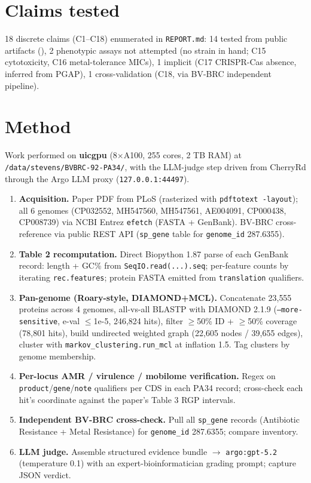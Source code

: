 \documentclass[11pt]{article}
\begin{document}
\section{Claims tested}
18 discrete claims (C1--C18) enumerated in \texttt{REPORT.md}: 14 tested from public artifacts
(\checkmark), 2 phenotypic assays not attempted (no strain in hand; C15 cytotoxicity, C16
metal-tolerance MICs), 1 implicit (C17 CRISPR-Cas absence, inferred from PGAP), 1 cross-validation
(C18, via BV-BRC independent pipeline).

\section{Method}
Work performed on \textbf{uicgpu} (8$\times$A100, 255 cores, 2 TB RAM) at
\texttt{/data/stevens/BVBRC-92-PA34/}, with the LLM-judge step driven from CherryRd through the
Argo LLM proxy (\texttt{127.0.0.1:44497}).

\begin{enumerate}
  \item \textbf{Acquisition.} Paper PDF from PLoS (rasterized with \texttt{pdftotext -layout});
        all 6 genomes (CP032552, MH547560, MH547561, AE004091, CP000438, CP008739) via NCBI Entrez
        \texttt{efetch} (FASTA + GenBank). BV-BRC cross-reference via public REST API
        (\texttt{sp\_gene} table for \texttt{genome\_id} 287.6355).
  \item \textbf{Table 2 recomputation.} Direct Biopython 1.87 parse of each GenBank record:
        length + GC\% from \texttt{SeqIO.read(...).seq}; per-feature counts by iterating
        \texttt{rec.features}; protein FASTA emitted from \texttt{translation} qualifiers.
  \item \textbf{Pan-genome (Roary-style, DIAMOND+MCL).} Concatenate 23{,}555 proteins across
        4 genomes, all-vs-all BLASTP with DIAMOND 2.1.9 (\texttt{--more-sensitive}, e-val $\le$1e-5,
        246{,}824 hits), filter $\ge$50\% ID + $\ge$50\% coverage (78{,}801 hits), build undirected
        weighted graph (22{,}605 nodes / 39{,}655 edges), cluster with
        \texttt{markov\_clustering.run\_mcl} at inflation 1.5. Tag clusters by genome membership.
  \item \textbf{Per-locus AMR / virulence / mobilome verification.} Regex on
        \texttt{product}/\texttt{gene}/\texttt{note} qualifiers per CDS in each PA34 record;
        cross-check each hit's coordinate against the paper's Table 3 RGP intervals.
  \item \textbf{Independent BV-BRC cross-check.} Pull all \texttt{sp\_gene} records (Antibiotic
        Resistance + Metal Resistance) for \texttt{genome\_id} 287.6355; compare inventory.
  \item \textbf{LLM judge.} Assemble structured evidence bundle $\to$ \texttt{argo:gpt-5.2}
        (temperature 0.1) with an expert-bioinformatician grading prompt; capture JSON verdict.
\end{enumerate}
\end{document}
